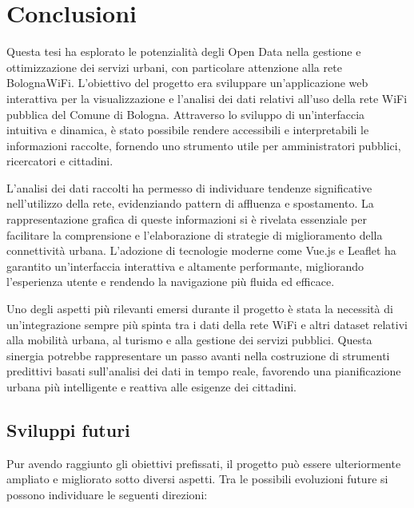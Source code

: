 \clearpage{\pagestyle{empty}\cleardoublepage}

\chapter*{Conclusioni}



Questa tesi ha esplorato le potenzialità degli Open Data nella gestione e ottimizzazione dei servizi urbani, con particolare attenzione alla rete BolognaWiFi. L'obiettivo del progetto era sviluppare un'applicazione web interattiva per la visualizzazione e l'analisi dei dati relativi all'uso della rete WiFi pubblica del Comune di Bologna. Attraverso lo sviluppo di un'interfaccia intuitiva e dinamica, è stato possibile rendere accessibili e interpretabili le informazioni raccolte, fornendo uno strumento utile per amministratori pubblici, ricercatori e cittadini.

L'analisi dei dati raccolti ha permesso di individuare tendenze significative nell'utilizzo della rete, evidenziando pattern di affluenza e spostamento. La rappresentazione grafica di queste informazioni si è rivelata essenziale per facilitare la comprensione e l'elaborazione di strategie di miglioramento della connettività urbana. L'adozione di tecnologie moderne come Vue.js e Leaflet ha garantito un'interfaccia interattiva e altamente performante, migliorando l'esperienza utente e rendendo la navigazione più fluida ed efficace.

Uno degli aspetti più rilevanti emersi durante il progetto è stata la necessità di un'integrazione sempre più spinta tra i dati della rete WiFi e altri dataset relativi alla mobilità urbana, al turismo e alla gestione dei servizi pubblici. Questa sinergia potrebbe rappresentare un passo avanti nella costruzione di strumenti predittivi basati sull'analisi dei dati in tempo reale, favorendo una pianificazione urbana più intelligente e reattiva alle esigenze dei cittadini.

\section*{Sviluppi futuri}

Pur avendo raggiunto gli obiettivi prefissati, il progetto può essere ulteriormente ampliato e migliorato sotto diversi aspetti. Tra le possibili evoluzioni future si possono individuare le seguenti direzioni:

